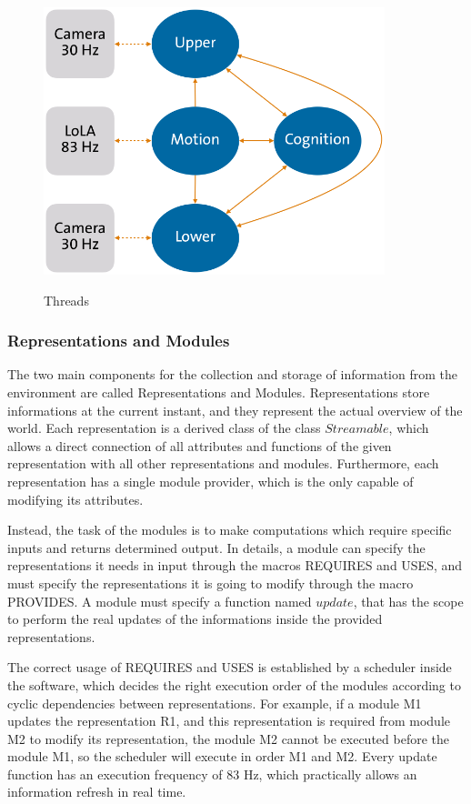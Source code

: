 \documentclass[a4paper, onecolumn, 12pt]{article}
\begin{document}
\begin{figure}
    \centering
    \includegraphics[width=0.5\linewidth]{assets/threads.png}
    \label{fig:threads}
    \caption{Threads}
\end{figure}

\subsubsection{Representations and Modules}
The two main components for the collection and storage of information from the environment
are called Representations and Modules.
Representations store informations at the current instant, and they represent the actual overview
of the world. Each representation is a derived class of the class $Streamable$, which allows a 
direct connection of all attributes and functions of the given representation with all other
representations and modules. Furthermore, each representation has a single module provider, which
is the only capable of modifying its attributes.

Instead, the task of the modules is to make computations which require specific inputs and returns
determined output. In details, a module can specify the representations it needs in input through
the macros REQUIRES and USES, and must specify the representations it is going to modify through
the macro PROVIDES. A module must specify a function named $update$, that has the scope to 
perform the real updates of the informations inside the provided representations.

The correct usage of REQUIRES and USES is established by a scheduler inside the software, which decides 
the right execution order of the modules according to cyclic dependencies between representations.
For example, if a module M1 updates the representation R1, and this representation is required from 
module M2 to modify its representation, the module M2 cannot be executed before the module M1, so the
scheduler will execute in order M1 and M2. 
Every update function has an execution frequency of 83 Hz, which practically allows an information 
refresh in real time.
\end{document}
